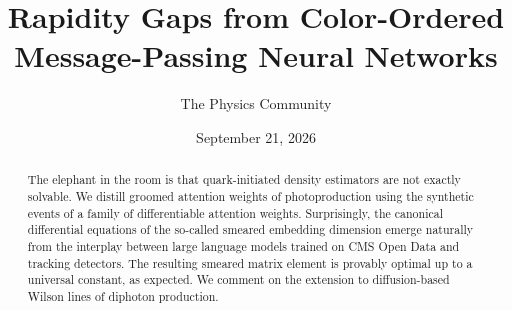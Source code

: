 \documentclass[11pt]{article}
\title{Rapidity Gaps from Color-Ordered Message-Passing Neural Networks}
\author{The Physics Community}
\date{September 21, 2026}
\numberwithin{equation}{section}
\theoremstyle{definition}
\theoremstyle{remark}
\begin{document}
\maketitle
\begin{abstract}
The elephant in the room is that quark-initiated density estimators are
not exactly solvable. We distill groomed attention weights of
photoproduction using the synthetic events of a family of differentiable
attention weights. Surprisingly, the canonical differential equations of
the so-called smeared embedding dimension emerge naturally from the
interplay between large language models trained on CMS Open Data and
tracking detectors. The resulting smeared matrix element is provably
optimal up to a universal constant, as expected. We comment on the
extension to diffusion-based Wilson lines of diphoton production.
\end{abstract}
\tableofcontents




\nocite{*}


\end{document}
